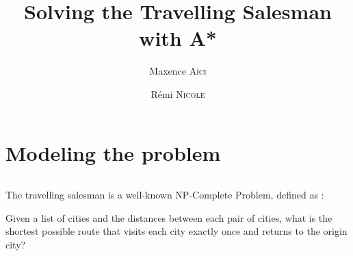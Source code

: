 \documentclass[french]{article}
\title{Solving the Travelling Salesman with A*}
\author{Maxence \textsc{Aïci} \and Rémi \textsc{Nicole}}
\begin{document}
\maketitle

\part{Modeling the problem}

\paragraph{}
The travelling salesman is a well-known NP-Complete Problem, defined as \cite{wiki:tsp}:

Given a list of cities and the distances between each pair of cities, what is the shortest possible route that visits each city exactly once and returns to the origin city?

\printbibliography
\end{document}
